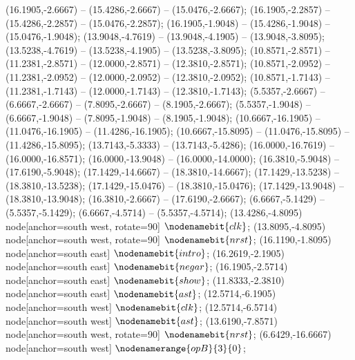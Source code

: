    (16.1905,-2.6667) -- (15.4286,-2.6667) -- (15.0476,-2.6667);
   (16.1905,-2.2857) -- (15.4286,-2.2857) -- (15.0476,-2.2857);
   (16.1905,-1.9048) -- (15.4286,-1.9048) -- (15.0476,-1.9048);
   (13.9048,-4.7619) -- (13.9048,-4.1905) -- (13.9048,-3.8095);
   (13.5238,-4.7619) -- (13.5238,-4.1905) -- (13.5238,-3.8095);
   (10.8571,-2.8571) -- (11.2381,-2.8571) -- (12.0000,-2.8571) -- (12.3810,-2.8571);
   (10.8571,-2.0952) -- (11.2381,-2.0952) -- (12.0000,-2.0952) -- (12.3810,-2.0952);
   (10.8571,-1.7143) -- (11.2381,-1.7143) -- (12.0000,-1.7143) -- (12.3810,-1.7143);
   (5.5357,-2.6667) -- (6.6667,-2.6667) -- (7.8095,-2.6667) -- (8.1905,-2.6667);
   (5.5357,-1.9048) -- (6.6667,-1.9048) -- (7.8095,-1.9048) -- (8.1905,-1.9048);
   (10.6667,-16.1905) -- (11.0476,-16.1905) -- (11.4286,-16.1905);
   (10.6667,-15.8095) -- (11.0476,-15.8095) -- (11.4286,-15.8095);
   (13.7143,-5.3333) -- (13.7143,-5.4286);
   (16.0000,-16.7619) -- (16.0000,-16.8571);
   (16.0000,-13.9048) -- (16.0000,-14.0000);
   (16.3810,-5.9048) -- (17.6190,-5.9048);
   (17.1429,-14.6667) -- (18.3810,-14.6667);
   (17.1429,-13.5238) -- (18.3810,-13.5238);
   (17.1429,-15.0476) -- (18.3810,-15.0476);
   (17.1429,-13.9048) -- (18.3810,-13.9048);
   (16.3810,-2.6667) -- (17.6190,-2.6667);
   (6.6667,-5.1429) -- (5.5357,-5.1429);
   (6.6667,-4.5714) -- (5.5357,-4.5714);
   (13.4286,-4.8095) node[anchor=south west, rotate=90] {$\nodenamebit{clk}$};
   (13.8095,-4.8095) node[anchor=south west, rotate=90] {$\nodenamebit{nrst}$};
   (16.1190,-1.8095) node[anchor=south east] {$\nodenamebit{intro}$};
   (16.2619,-2.1905) node[anchor=south east] {$\nodenamebit{negar}$};
   (16.1905,-2.5714) node[anchor=south east] {$\nodenamebit{show}$};
   (11.8333,-2.3810) node[anchor=south east] {$\nodenamebit{ast}$};
   (12.5714,-6.1905) node[anchor=south west] {$\nodenamebit{clk}$};
   (12.5714,-6.5714) node[anchor=south west] {$\nodenamebit{ast}$};
   (13.6190,-7.8571) node[anchor=south west, rotate=90] {$\nodenamebit{nrst}$};
   (6.6429,-16.6667) node[anchor=south west] {$\nodenamerange{opB}{3}{0}$};
